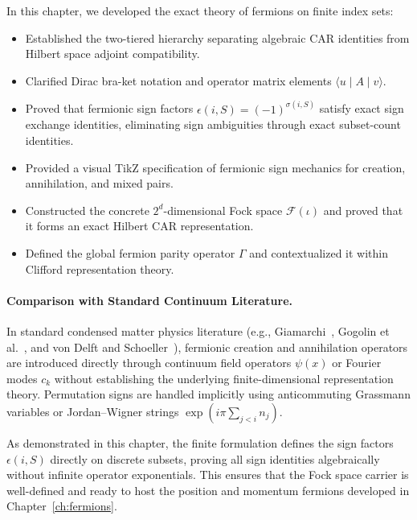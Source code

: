 In this chapter, we developed the exact theory of fermions on finite index sets:
\begin{itemize}
    \item Established the two-tiered hierarchy separating algebraic CAR identities from Hilbert space adjoint compatibility.
    \item Clarified Dirac bra-ket notation and operator matrix elements $\langle u \mid A \mid v \rangle$.
    \item Proved that fermionic sign factors $\epsilon(i, S) = (-1)^{\sigma(i, S)}$ satisfy exact sign exchange identities, eliminating sign ambiguities through exact subset-count identities.
    \item Provided a visual TikZ specification of fermionic sign mechanics for creation, annihilation, and mixed pairs.
    \item Constructed the concrete $2^d$-dimensional Fock space $\mathcal{F}(\iota)$ and proved that it forms an exact Hilbert CAR representation.
    \item Defined the global fermion parity operator $\Gamma$ and contextualized it within Clifford representation theory.
\end{itemize}

\paragraph{Comparison with Standard Continuum Literature.}
In standard condensed matter physics literature (e.g., Giamarchi~\cite{giamarchi2004}, Gogolin et al.~\cite{gogolin1998}, and von Delft and Schoeller~\cite{vondelft1998}), fermionic creation and annihilation operators are introduced directly through continuum field operators $\psi(x)$ or Fourier modes $c_k$ without establishing the underlying finite-dimensional representation theory. Permutation signs are handled implicitly using anticommuting Grassmann variables or Jordan--Wigner strings $\exp(i \pi \sum_{j < i} n_j)$.

As demonstrated in this chapter, the finite formulation defines the sign factors $\epsilon(i, S)$ directly on discrete subsets, proving all sign identities algebraically without infinite operator exponentials. This ensures that the Fock space carrier is well-defined and ready to host the position and momentum fermions developed in Chapter~\ref{ch:fermions}.
